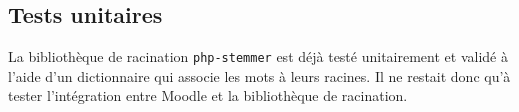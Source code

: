 \subsection{Tests unitaires} \label{dev_test_unitaire}
La biblioth\`eque de racination \texttt{php-stemmer} est d\'ej\`a test\'e unitairement et valid\'e \`a l'aide d'un dictionnaire qui associe les mots \`a leurs racines.
Il ne restait donc qu'\`a tester l'int\'egration entre Moodle et la biblioth\`eque de racination.
